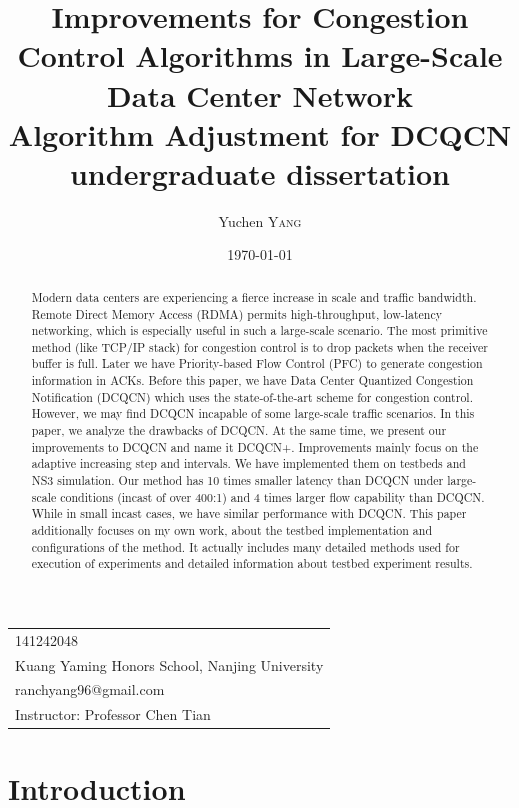 \documentclass[12pt,a4paper]{article}
\title{Improvements for Congestion Control Algorithms in Large-Scale Data Center Network \\ Algorithm Adjustment for DCQCN \\ undergraduate dissertation} %
\author{Yuchen \textsc{Yang}} %
\date{\today} %
\begin{document}
\maketitle %

\begin{center}
\begin{tabular}{l}
141242048 \\
Kuang Yaming Honors School, Nanjing University \\
ranchyang96@gmail.com \\
Instructor: Professor Chen Tian
\end{tabular}
\end{center}


\begin{abstract}
	Modern data centers are experiencing a fierce increase in scale and traffic bandwidth.
	Remote Direct Memory Access (RDMA) permits high-throughput, low-latency networking,
	which is especially useful in such a large-scale scenario.
	The most primitive method (like TCP/IP stack) for congestion control is to drop packets when the receiver buffer is full.
	Later we have Priority-based Flow Control (PFC) to generate congestion information in ACKs.
	Before this paper, we have Data Center Quantized Congestion Notification (DCQCN) which uses the state-of-the-art scheme for congestion control.
	However, we may find DCQCN incapable of some large-scale traffic scenarios.
	In this paper, we analyze the drawbacks of DCQCN.
	At the same time, we present our improvements to DCQCN and name it DCQCN+.
	Improvements mainly focus on the adaptive increasing step and intervals.
	We have implemented them on testbeds and NS3 simulation.
	Our method has 10 times smaller latency than DCQCN under large-scale conditions (incast of over 400:1) and 4 times larger flow capability than DCQCN.
	While in small incast cases, we have similar performance with DCQCN.
	This paper additionally focuses on my own work, about the testbed implementation and configurations of the method.
	It actually includes many detailed methods used for execution of experiments and detailed information about testbed experiment results.
\end{abstract}

\tableofcontents

\section{Introduction}
\end{document}
